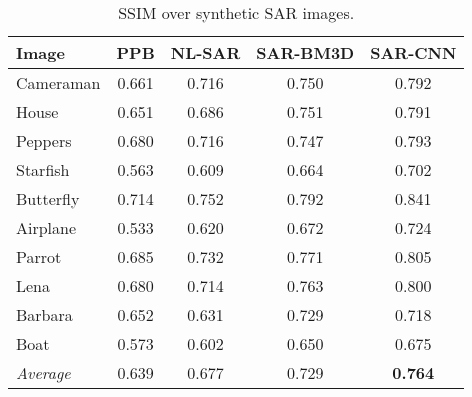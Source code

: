 \documentclass{article}
\begin{document}
\begin{table}[t]
	\centering
	\caption{SSIM over synthetic SAR images.}
	\label{tab:SSIM}
	\footnotesize
	\begin{tabular}{lcccc}
		\toprule
		Image     &    PPB & NL-SAR & SAR-BM3D & SAR-CNN \\ \midrule
		Cameraman &  0.661 &  0.716 &    0.750 &   0.792 \\
		House     &  0.651 &  0.686 &    0.751 &   0.791 \\
		Peppers   &  0.680 &  0.716 &    0.747 &   0.793 \\
		Starfish  &  0.563 &  0.609 &    0.664 &   0.702 \\
		Butterfly &  0.714 &  0.752 &    0.792 &   0.841 \\
		Airplane  &  0.533 &  0.620 &    0.672 &   0.724 \\
		Parrot    &  0.685 &  0.732 &    0.771 &   0.805 \\
		Lena      &  0.680 &  0.714 &    0.763 &   0.800 \\
		Barbara   &  0.652 &  0.631 &    0.729 &   0.718 \\
		Boat      &  0.573 &  0.602 &    0.650 &   0.675 \\ \midrule
\textsl{Average}  &  0.639 &  0.677 &    0.729 &   \textbf{0.764} \\
		\bottomrule
	\end{tabular}
\end{table}
\end{document}
